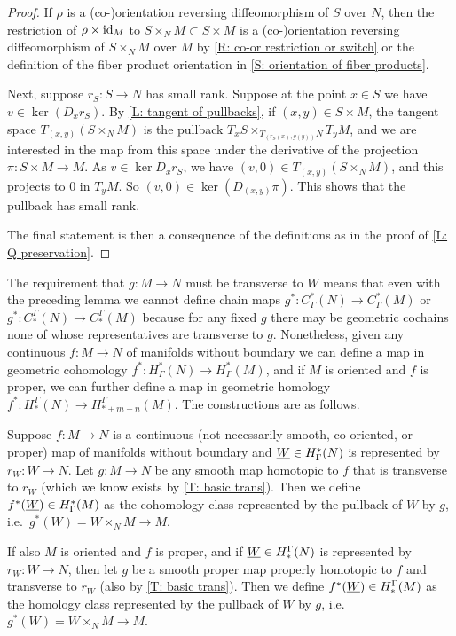 \begin{proof}
	If $\rho$ is a (co-)orientation reversing diffeomorphism of $S$ over $N$, then the restriction of $\rho \times \mathrm{id}_M$ to $S \times_N M \subset S \times M$ is a (co-)orientation reversing diffeomorphism of $S \times_N M$ over $M$ by \cref{R: co-or restriction or switch} or the definition of the fiber product orientation in \cref{S: orientation of fiber products}.

	Next, suppose $r_S \colon S \to N$ has small rank.
	Suppose at the point $x \in S$ we have $v \in \ker(D_x r_S)$.
	By \cref{L: tangent of pullbacks}, if $(x,y) \in S \times M$, the tangent space $T_{(x,y)}(S \times_N M)$ is the pullback $T_xS\times_{T_{(r_S(x),g(y))}N} T_y M$, and we are interested in the map from this space under the derivative of the projection $\pi \colon S \times M \to M$.
	As $v \in \ker D_xr_S$, we have $(v,0) \in T_{(x,y)}(S \times_N M)$, and this projects to $0$ in $T_yM$.
	So $(v,0) \in \ker(D_{(x,y)}\pi)$.
	This shows that the pullback has small rank.

	The final statement is then a consequence of the definitions as in the proof of \cref{L: Q preservation}.
\end{proof}

The requirement that $g \colon M \to N$ must be transverse to $W$ means that even with the preceding lemma we cannot define chain maps $g^* \colon C^*_\Gamma(N) \to C^*_\Gamma(M)$ or $g^* \colon C_*^\Gamma(N) \to C_*^\Gamma(M)$ because for any fixed $g$ there may be geometric cochains none of whose representatives are transverse to $g$.
Nonetheless, given any continuous $f \colon M \to N$ of manifolds without boundary we can define a map in geometric cohomology $f^* \colon H^*_\Gamma(N) \to H^*_\Gamma(M)$, and if $M$ is oriented and $f$ is proper, we can further define a map in geometric homology $f^* \colon H_*^\Gamma(N) \to H_{*+m-n}^\Gamma(M)$.
The constructions are as follows.

\begin{definition}\label{D: cohomology pullback and homology transfer}
	Suppose $f \colon M \to N$ is a continuous (not necessarily smooth, co-oriented, or proper) map of manifolds without boundary and $\underline{W} \in H^*_\Gamma(N)$ is represented by $r_W \colon W \to N$.
	Let $g \colon M \to N$ be any smooth map homotopic to $f$ that is transverse to $r_W$ (which we know exists by \cref{T: basic trans}).
	Then we define $f^*(\underline{W}) \in H^*_\Gamma(M)$ as the cohomology class represented by the pullback of $W$ by $g$, i.e.\ $g^*(W) = W \times_N M \to M$.

	If also $M$ is oriented and $f$ is proper, and if $\underline{W} \in H_*^\Gamma(N)$ is represented by $r_W \colon W \to N$, then let $g$ be a smooth proper map properly homotopic to $f$ and transverse to $r_W$ (also by \cref{T: basic trans}).
	Then we define $f^*(\underline{W}) \in H_*^\Gamma(M)$ as the homology class represented by the pullback of $W$ by $g$, i.e.\ $g^*(W) = W \times_N M \to M$.
\end{definition}

